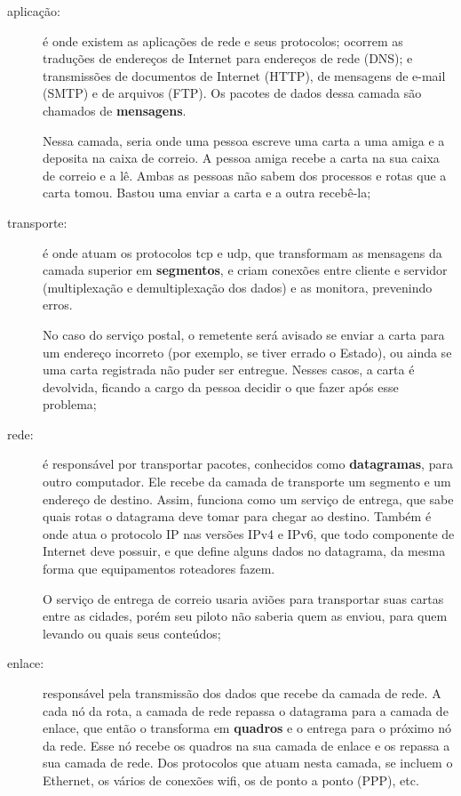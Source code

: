 \begin{description}
    \item[aplicação:] é onde existem as aplicações de rede e seus protocolos; ocorrem
        as traduções de endereços de Internet para endereços de rede (DNS); e
        transmissões de documentos de Internet (HTTP), de mensagens de e-mail (SMTP) e
        de arquivos (FTP). Os pacotes de dados dessa camada são chamados de
        \textbf{mensagens}.

        Nessa camada, seria onde uma pessoa escreve uma carta a uma amiga e a deposita
        na caixa de correio. A pessoa amiga recebe a carta na sua caixa de correio e a
        lê. Ambas as pessoas não sabem dos processos e rotas que a carta tomou. Bastou
        uma enviar a carta e a outra recebê-la;

    \item[transporte:] é onde atuam os protocolos \gls{tcp} e \gls{udp}, que
        transformam as mensagens da camada superior em \textbf{segmentos}, e criam
        conexões entre cliente e servidor (multiplexação e demultiplexação dos dados)
        e as monitora, prevenindo erros.

        No caso do serviço postal, o remetente será avisado se enviar a carta para um
        endereço incorreto (por exemplo, se tiver errado o Estado), ou ainda se uma
        carta registrada não puder ser entregue. Nesses casos, a carta é devolvida,
        ficando a cargo da pessoa decidir o que fazer após esse problema;

    \item[rede:] é responsável por transportar pacotes, conhecidos como
        \textbf{datagramas}, para outro computador. Ele recebe da camada de transporte
        um segmento e um endereço de destino. Assim, funciona como um serviço de
        entrega, que sabe quais rotas o datagrama deve tomar para chegar ao destino.
        Também é onde atua o protocolo IP nas versões IPv4 e IPv6, que todo componente
        de Internet deve possuir, e que define alguns dados no datagrama, da mesma
        forma que equipamentos roteadores fazem.

        O serviço de entrega de correio usaria aviões para transportar suas cartas
        entre as cidades, porém seu piloto não saberia quem as enviou, para quem
        levando ou quais seus conteúdos;

    \item[enlace:] responsável pela transmissão dos dados que recebe da camada de rede.
        A cada nó da rota, a camada de rede repassa o datagrama para a camada de
        enlace, que então o transforma em \textbf{quadros} e o entrega para o próximo
        nó da rede. Esse nó recebe os quadros na sua camada de enlace e os repassa a
        sua camada de rede. Dos protocolos que atuam nesta camada, se incluem o
        Ethernet, os vários de conexões wifi, os de ponto a ponto (PPP), etc.


\end{description}
